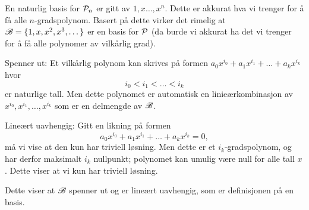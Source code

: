 \begin{losning}



\begin{punkt}
En naturlig basis for $\P_n$ er gitt av $1,x\dots,x^n$. Dette er akkurat hva vi trenger for å få alle $n$-gradspolynom. Basert på dette virker det rimelig at $\B=\{1,x,x^2,x^3,\dots\}$ er en basis for $\P$ (da burde vi akkurat ha det vi trenger for å få alle polynomer av vilkårlig grad). 
\end{punkt}

\begin{punkt}
Spenner ut: Et vilkårlig polynom kan skrives på formen $a_0x^{i_0}+a_1x^{i_1}+\dots +a_kx^{i_k}$ hvor $$i_0<i_1<\dots<i_k$$ er naturlige tall. Men dette polynomet er automatisk en linieærkombinasjon av $x^{i_0},x^{i_1},\dots,x^{i_k}$ som er en delmengde av $\B$.

\noindent
Lineært uavhengig: Gitt en likning på formen $$a_0x^{i_0}+a_1x^{i_1}+\dots +a_kx^{i_k}=0,$$ må vi vise at den kun har triviell løsning. Men dette er et $i_k$-gradspolynom, og har derfor maksimalt $i_k$ nullpunkt; polynomet kan umulig være null for alle tall $x$. Dette viser at vi kun har triviell løsning.

\noindent
Dette viser at $\B$ spenner ut og er lineært uavhengig, som er definisjonen på en basis.
\end{punkt}

\end{losning}






